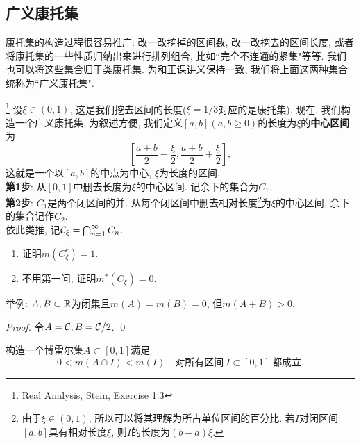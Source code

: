 \subsection{广义康托集}
康托集的构造过程很容易推广: 改一改挖掉的区间数, 改一改挖去的区间长度,
或者将康托集的一些性质归纳出来进行排列组合, 比如``完全不连通的紧集"等等. 我们也可以将这些集合归于类康托集. 为和正课讲义保持一致, 我们将上面这两种集合统称为``广义康托集". 

\begin{example}\footnote{Real Analysis, Stein, Exercise 1.3}
    设$\xi \in (0, 1)$, 这是我们挖去区间的长度($\xi = 1/3$对应的是康托集). 现在, 我们构造一个广义康托集. 为叙述方便, 我们定义$[a,b](a,b \geq 0)$的长度为$\xi$的\textbf{中心区间}为$$\displaystyle{\left[\frac{a+b}{2}-\frac{\xi}{2}, \frac{a+b}{2} + \frac{\xi}{2} \right]}, $$ 这就是一个以$[a,b]$的中点为中心, $\xi$为长度的区间.  \\
    \textbf{第1步}: 从$[0,1]$中删去长度为$\xi$的中心区间. 记余下的集合为$C_1$. \\
    \textbf{第2步}: $C_1$是两个闭区间的并. 从每个闭区间中删去相对长度\footnote{由于$\xi \in (0,1)$, 所以可以将其理解为所占单位区间的百分比. 若$I$对闭区间$[a,b]$具有相对长度$\xi$, 则$I$的长度为$(b-a)\xi$. }为$\xi$的中心区间, 余下的集合记作$C_2$. \\
    依此类推, 记$\mathcal{C}_\xi = \bigcap_{n=1}^{\infty}C_n$.
    \begin{enumerate}
    \item 证明$m(C_\xi^c) = 1$.
    \item 不用第一问, 证明$m^*(C_\xi) = 0$. 
    \end{enumerate}
\end{example}



\begin{example} %
    举例: $A, B \subset \mathbb{R}$为闭集且$m(A)=m(B)=0$, 但$m(A+B)>0$.
\end{example}
\begin{proof}
    令$A = \mathcal{C}, B = \mathcal{C} / 2$. 
    \qed
\end{proof}


\begin{example}
    构造一个博雷尔集$A \subset [0,1]$满足
    $$ 0<m(A \cap I)<m(I) \quad \text{对所有区间}~I \subset [0,1]~\text{都成立}. $$
\end{example}






